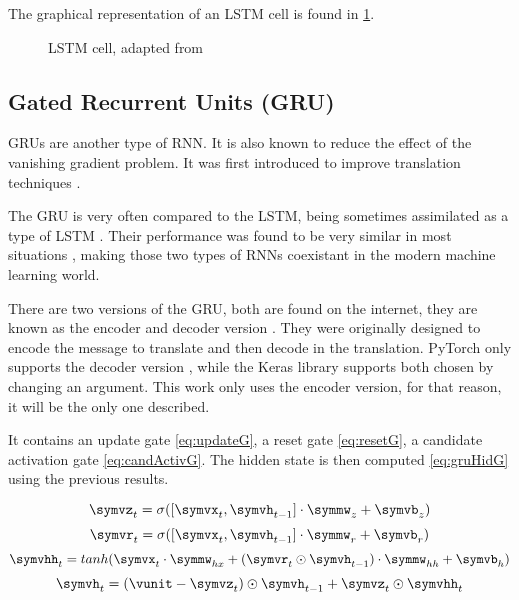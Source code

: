 The graphical representation of an LSTM cell is found in \cref{fig:lstmCell}.

\begin{figure}[t]
  \centering
  
  \caption{\acs{LSTM} cell, adapted from \cite{wikiLSTM}\label{fig:lstmCell}}
\end{figure}

\subsection{Gated Recurrent Units (GRU)}

GRUs are another type of RNN. It is also known to reduce the effect of the vanishing gradient problem. It was first introduced to improve translation techniques \cite{gru}.

The \ac{GRU} is very often compared to the \ac{LSTM}, being sometimes assimilated as a type of \ac{LSTM} \cite{nbLSTM}. Their performance was found to be very similar in most situations \cite{gruVSlstm}, making those two types of \acp{RNN} coexistant in the modern machine learning world.

There are two versions of the \ac{GRU}, both are found on the internet, they are known as the encoder and decoder version \cite{gru}. They were originally designed to encode the message to translate and then decode in the translation. PyTorch only supports the decoder version \cite{gruPyTorch}, while the Keras library supports both \cite{gruKeras} chosen by changing an argument. This work only uses the encoder version, for that reason, it will be the only one described.

It contains an update gate \cref{eq:updateG}, a reset gate \cref{eq:resetG}, a candidate activation gate \cref{eq:candActivG}. The hidden state is then computed \cref{eq:gruHidG} using the previous results.

\begin{equation}\label{eq:updateG}
  \symvz_t= \sigma([\symvx_t,\symvh_{t-1}] \cdot \symmw_z + \symvb_z)
\end{equation}
\begin{equation}\label{eq:resetG}
  \symvr_t= \sigma([\symvx_t,\symvh_{t-1}] \cdot \symmw_r + \symvb_r)
\end{equation}
\begin{equation}\label{eq:candActivG}
  \symvhh_t=tanh(\symvx_t\cdot \symmw_{hx}+(\symvr_t\odot\symvh_{t-1}) \cdot \symmw_{hh} + \symvb_h)
\end{equation}
\begin{equation}\label{eq:gruHidG}
  \symvh_t=(\vunit-\symvz_t)\odot \symvh_{t-1} + \symvz_t\odot \symvhh_t
\end{equation}

